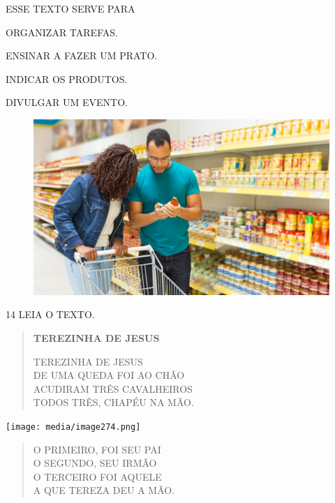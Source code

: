 ESSE TEXTO SERVE PARA

\begin{escolha}
\item ORGANIZAR TAREFAS.

\item ENSINAR A FAZER UM PRATO.

\item INDICAR OS PRODUTOS.

\item DIVULGAR UM EVENTO.
\end{escolha}

\begin{figure}[H]
\centering
\includegraphics[width=\textwidth]{media/image273.png}
\end{figure}

\pagebreak

\num{14} LEIA O TEXTO. \enlargethispage{2\baselineskip}

\begin{myquote}
\begin{verse}
\textbf{TEREZINHA DE JESUS}

TEREZINHA DE JESUS\\
DE UMA QUEDA FOI AO CHÃO\\
ACUDIRAM TRÊS CAVALHEIROS\\
TODOS TRÊS, CHAPÉU NA MÃO.
\end{verse}

\vspace{1cm}

\begin{center}
\texttt{[image: media/image274.png]}
\end{center}

\vspace{1cm}

\begin{verse}
O PRIMEIRO, FOI SEU PAI\\
O SEGUNDO, SEU IRMÃO\\
O TERCEIRO FOI AQUELE\\
A QUE TEREZA DEU A MÃO.
\end{verse}

\end{myquote}

